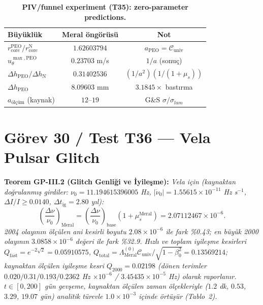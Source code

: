 \documentclass[12pt,a4paper]{article}
\begin{document}
\begin{table}[!htbp]
\centering\footnotesize
\setlength{\tabcolsep}{3pt}
\caption{\textbf{PIV/funnel experiment (T35): zero-parameter predictions.}}
\label{tab:piv}
\vspace{0.1cm}
\begin{tabular}{@{}l|c|c@{}}
\toprule
Büyüklük & Meral öngörüsü & Not \\
\midrule
$r_{\mathrm{core}}^{\mathrm{PEO}}/r_{\mathrm{core}}^{\mathrm{N}}$ & $1.62603794$ & $a_{\mathrm{PEO}}=\mathcal{C}_{\mathrm{univ}}$ \\
$u_\theta^{\max,\mathrm{PEO}}$ & $0.23703$ m/s & $1/a$ (sonuç) \\
$\Delta h_{\mathrm{PEO}}/\Delta h_{\mathrm{N}}$ & $0.31402536$ & $(1/a^2)(1/(1+\mu_s))$ \\
$\Delta h_{\mathrm{PEO}}$ & $8.09603$ mm & $3.1845\times$ bastırma \\
$a_{\mathrm{ölçüm}}$ (kaynak) & $12$--$19$ & G\&S $\sigma/\sigma_{lam}$ \\
\bottomrule
\end{tabular}
\end{table}

\section{Görev 30 / Test T36 --- Vela Pulsar Glitch}

\textbf{Teorem GP-III.2 (Glitch Genliği ve İyileşme):} \textit{Vela için
(kaynaktan doğrulanmış girdiler: $\nu_0=11.194615396005$ Hz,
$|\dot\nu_0|=1.55615\times 10^{-11}$ Hz s$^{-1}$,
$\Delta I/I \ge 0.0140$, $\Delta t_{\mathrm{ig}}=2.80$ yıl):}
\begin{equation}
\boxed{\left(\frac{\Delta\nu}{\nu_0}\right)_{\mathrm{Meral}}
=\left(\frac{\Delta\nu}{\nu_0}\right)_{\mathrm{base}}
(1+\mu_s^{\mathrm{Meral}})=2.07112467\times 10^{-6}.}
\end{equation}
\textit{2004 olayının ölçülen ani kesirli boyutu $2.08\times 10^{-6}$
ile fark \%0.43; en büyük 2000 olayının $3.0858\times 10^{-6}$ değeri
ile fark \%32.9. Hızlı ve toplam iyileşme kesirleri
$Q_{\mathrm{fast}}=e^{-2\sqrt{2}}=0.05910575$,
$Q_{\mathrm{total}}=\Lambda_{\mathrm{Meral}}^{(0)}\mathcal{C}_{\mathrm{univ}}/
\sqrt{1-\beta_0^2}=0.13569214$; kaynaktan ölçülen iyileşme kesri
$Q_{2000}=0.02198$ (dönen terimler $0.020/0.31/0.193/0.2362$ Hz
$\times 10^{-6}$ / $3.45435\times 10^{-5}$ Hz) olarak raporlanır.
$t\in[0,200]$ gün gevşeme, kaynaktan ölçülen zaman ölçekleriyle
($1.2$ dk, $0.53$, $3.29$, $19.07$ gün) analitik türevle $1.0\times 10^{-3}$
içinde örtüşür (Tablo~2).}
\end{document}
